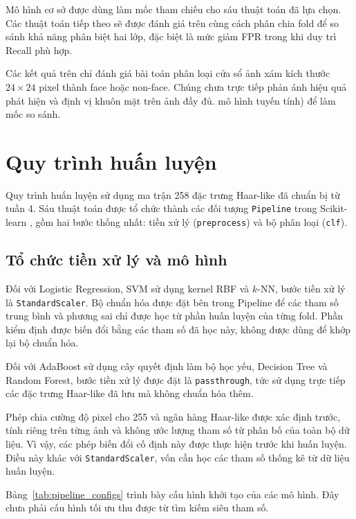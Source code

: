 \documentclass[12pt,a4paper,oneside]{report}
\begin{document}
Mô hình cơ sở được dùng làm mốc tham chiếu cho sáu thuật toán
đã lựa chọn. Các thuật toán tiếp theo sẽ được đánh giá trên
cùng cách phân chia fold để so sánh khả năng phân biệt hai lớp,
đặc biệt là mức giảm FPR trong khi duy trì Recall phù hợp.

Các kết quả trên chỉ đánh giá bài toán phân loại cửa sổ ảnh
xám kích thước $24 \times 24$ pixel thành face hoặc non-face.
Chúng chưa trực tiếp phản ánh hiệu quả phát hiện và định vị
khuôn mặt trên ảnh đầy đủ.
mô hình tuyến tính) để làm mốc so sánh.

\section{Quy trình huấn luyện}
\label{sec:quy_trinh_huan_luyen}

Quy trình huấn luyện sử dụng ma trận 258 đặc trưng Haar-like
đã chuẩn bị từ tuần 4. Sáu thuật toán được tổ chức thành
các đối tượng \texttt{Pipeline} trong Scikit-learn
\cite{pedregosa2011}, gồm hai bước thống nhất:
tiền xử lý (\texttt{preprocess}) và bộ phân loại
(\texttt{clf}).

\subsection{Tổ chức tiền xử lý và mô hình}

Đối với Logistic Regression, SVM sử dụng kernel RBF
và $k$-NN, bước tiền xử lý là \texttt{StandardScaler}.
Bộ chuẩn hóa được đặt bên trong Pipeline để các tham số
trung bình và phương sai chỉ được học từ phần huấn luyện
của từng fold. Phần kiểm định được biến đổi bằng các tham số
đã học này, không được dùng để khớp lại bộ chuẩn hóa.

Đối với AdaBoost sử dụng cây quyết định làm bộ học yếu,
Decision Tree và Random Forest, bước tiền xử lý được đặt
là \texttt{passthrough}, tức sử dụng trực tiếp các đặc trưng
Haar-like đã lưu mà không chuẩn hóa thêm.

Phép chia cường độ pixel cho 255 và ngân hàng Haar-like
được xác định trước, tính riêng trên từng ảnh và không
ước lượng tham số từ phân bố của toàn bộ dữ liệu.
Vì vậy, các phép biến đổi cố định này được thực hiện
trước khi huấn luyện. Điều này khác với
\texttt{StandardScaler}, vốn cần học các tham số thống kê
từ dữ liệu huấn luyện.

Bảng~\ref{tab:pipeline_configs} trình bày cấu hình khởi tạo
của các mô hình. Đây chưa phải cấu hình tối ưu thu được
từ tìm kiếm siêu tham số.
\end{document}
